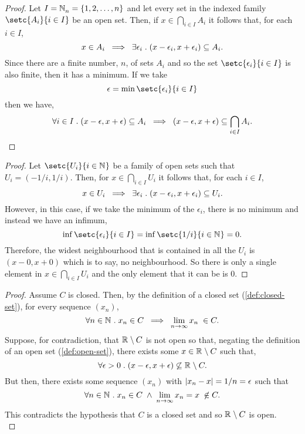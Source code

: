 \documentclass[../MathsNotesBase.tex]{subfiles}
\begin{document}
{		\bigskip
		\begin{proof}
			Let ${ I = \mathbb{N}^{}_n = \{ 1, 2, \dots, n \} }$ and let every set in the indexed family ${ \setc{A_i}{i \in I} }$ be an open set. Then, if ${ x \in \bigcap_{i \in I} A_i }$ it follows that, for each ${ i \in I }$,
			\[ x \in A_i \; \implies \; \exists \epsilon_i \;.\; (x - \epsilon_i, x + \epsilon_i) \subseteq A_i. \]
			Since there are a finite number, $n$, of sets $A_i$ and so the set ${ \setc{\epsilon_i}{i \in I} }$ is also finite, then it has a minimum. If we take
			\[ \epsilon = \min \setc{\epsilon_i}{i \in I} \]
			then we have,
			\[ \forall i \in I \;.\; (x - \epsilon, x + \epsilon) \subseteq A_i \; \implies \; (x - \epsilon, x + \epsilon) \subseteq \bigcap_{i \in I} A_i.  \qedhere \]
		\end{proof}
		
		\bigskip
		\begin{proof}
			Let ${ \setc{U_i}{i \in \N{}} }$ be a family of open sets such that ${ U_i = (-1/i, 1/i) }$. Then, for ${ x \in \bigcap_{i \in I} U_i }$ it follows that, for each ${ i \in I }$,
			\[ x \in U_i \; \implies \; \exists \epsilon_i \;.\; (x - \epsilon_i, x + \epsilon_i) \subseteq U_i. \]
			However, in this case, if we take the minimum of the $\epsilon_i$, there is no minimum and instead we have an infimum,
			\[ \inf \setc{\epsilon_i}{i \in I} = \inf \setc{1/i}{i \in \N{}} = 0. \]
			Therefore, the widest neighbourhood that is contained in all the $U_i$ is ${ (x - 0, x + 0) }$ which is to say, no neighbourhood. So there is only a single element in ${ x \in \bigcap_{i \in I} U_i }$ and the only element that it can be is 0.
		\end{proof}
		
		
		\bigskip
		\begin{proof}
			Assume $C$ is closed. Then, by the definition of a closed set (\ref{def:closed-set}), for every sequence $(x_n)$,
			\[ \forall n \in \mathbb{N}^{} \;.\; x_n \in C \; \implies \; \lim_{n \to \infty} x_n \; \in C. \]
			Suppose, for contradiction, that ${ \mathbb{R}^{} \setminus C }$ is not open so that, negating the definition of an open set (\ref{def:open-set}), there exists some ${ x \in \mathbb{R}^{} \setminus C }$ such that,
			\[ \forall \epsilon > 0 \logicsep (x - \epsilon, x + \epsilon) \centernot\subseteq \R{} \setminus C. \]
			But then, there exists some sequence $(x_n)$ with ${ \left\lvert x_n - x\right\rvert = 1/n = \epsilon }$ such that
			\[ \forall n \in \N{} \logicsep x_n \in C \; \land \; \lim_{n \to \infty} x_n = x \; \centernot\in C. \]
			This contradicts the hypothesis that $C$ is a closed set and so ${ \mathbb{R}^{} \setminus C }$ is open.\\
			

\end{proof}}
\end{document}
